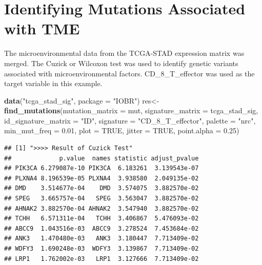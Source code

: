 \documentclass[
  12pt,
]{book}
\newenvironment{Shaded}{\begin{snugshade}}{\end{snugshade}}
\newcommand{\AttributeTok}[1]{\textcolor[rgb]{0.13,0.29,0.53}{#1}}
\newcommand{\ConstantTok}[1]{\textcolor[rgb]{0.56,0.35,0.01}{#1}}
\newcommand{\FloatTok}[1]{\textcolor[rgb]{0.00,0.00,0.81}{#1}}
\newcommand{\FunctionTok}[1]{\textcolor[rgb]{0.13,0.29,0.53}{\textbf{#1}}}
\newcommand{\NormalTok}[1]{#1}
\newcommand{\OtherTok}[1]{\textcolor[rgb]{0.56,0.35,0.01}{#1}}
\newcommand{\StringTok}[1]{\textcolor[rgb]{0.31,0.60,0.02}{#1}}
\begin{document}
\hypertarget{identifying-mutations-associated-with-tme}{%
\section{Identifying Mutations Associated with TME}\label{identifying-mutations-associated-with-tme}}

The microenvironmental data from the TCGA-STAD expression matrix was merged. The Cuzick or Wilcoxon test was used to identify genetic variants associated with microenvironmental factors. CD\_8\_T\_effector was used as the target variable in this example.

\begin{Shaded}
\begin{Highlighting}[]
\FunctionTok{data}\NormalTok{(}\StringTok{"tcga\_stad\_sig"}\NormalTok{, }\AttributeTok{package =} \StringTok{"IOBR"}\NormalTok{)}
\NormalTok{res}\OtherTok{\textless{}{-}}\FunctionTok{find\_mutations}\NormalTok{(}\AttributeTok{mutation\_matrix     =}\NormalTok{ mut, }
                    \AttributeTok{signature\_matrix    =}\NormalTok{ tcga\_stad\_sig, }
                    \AttributeTok{id\_signature\_matrix =} \StringTok{"ID"}\NormalTok{, }
                    \AttributeTok{signature           =} \StringTok{"CD\_8\_T\_effector"}\NormalTok{,}
                    \AttributeTok{palette             =} \StringTok{"nrc"}\NormalTok{,}
                    \AttributeTok{min\_mut\_freq        =} \FloatTok{0.01}\NormalTok{, }
                    \AttributeTok{plot                =} \ConstantTok{TRUE}\NormalTok{, }
                    \AttributeTok{jitter              =} \ConstantTok{TRUE}\NormalTok{, }
                    \AttributeTok{point.alpha         =} \FloatTok{0.25}\NormalTok{)}
\end{Highlighting}
\end{Shaded}

\begin{verbatim}
## [1] ">>>> Result of Cuzick Test"
##             p.value  names statistic adjust_pvalue
## PIK3CA 6.279087e-10 PIK3CA  6.183261  3.139543e-07
## PLXNA4 8.196539e-05 PLXNA4  3.938580  2.049135e-02
## DMD    3.514677e-04    DMD  3.574075  3.882570e-02
## SPEG   3.665757e-04   SPEG  3.563047  3.882570e-02
## AHNAK2 3.882570e-04 AHNAK2  3.547940  3.882570e-02
## TCHH   6.571311e-04   TCHH  3.406867  5.476093e-02
## ABCC9  1.043516e-03  ABCC9  3.278524  7.453684e-02
## ANK3   1.470480e-03   ANK3  3.180447  7.713409e-02
## WDFY3  1.690248e-03  WDFY3  3.139867  7.713409e-02
## LRP1   1.762002e-03   LRP1  3.127666  7.713409e-02
\end{verbatim}
\end{document}
